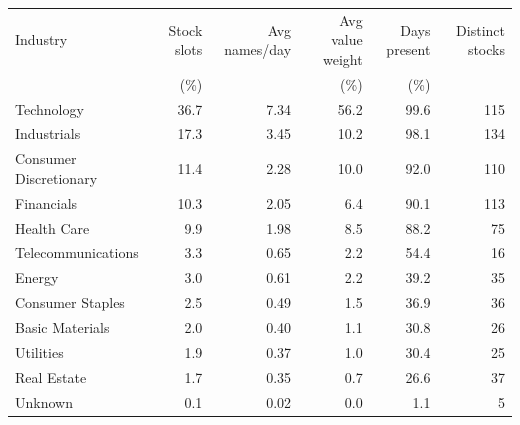 \begin{tabular}{lrrrrr}
\toprule
Industry & Stock slots & Avg names/day & Avg value weight & Days present & Distinct stocks \\
 & (\%) & & (\%) & (\%) & \\
\midrule
Technology & 36.7 & 7.34 & 56.2 & 99.6 & 115 \\
Industrials & 17.3 & 3.45 & 10.2 & 98.1 & 134 \\
Consumer Discretionary & 11.4 & 2.28 & 10.0 & 92.0 & 110 \\
Financials & 10.3 & 2.05 & 6.4 & 90.1 & 113 \\
Health Care & 9.9 & 1.98 & 8.5 & 88.2 & 75 \\
Telecommunications & 3.3 & 0.65 & 2.2 & 54.4 & 16 \\
Energy & 3.0 & 0.61 & 2.2 & 39.2 & 35 \\
Consumer Staples & 2.5 & 0.49 & 1.5 & 36.9 & 36 \\
Basic Materials & 2.0 & 0.40 & 1.1 & 30.8 & 26 \\
Utilities & 1.9 & 0.37 & 1.0 & 30.4 & 25 \\
Real Estate & 1.7 & 0.35 & 0.7 & 26.6 & 37 \\
Unknown & 0.1 & 0.02 & 0.0 & 1.1 & 5 \\
\bottomrule
\end{tabular}
